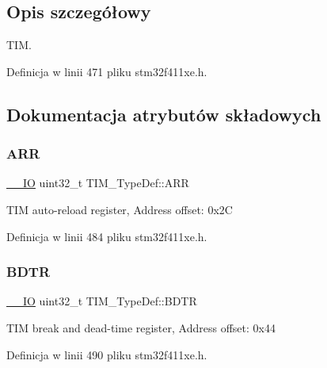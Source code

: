 \subsection{Opis szczegółowy}
T\+IM. 

Definicja w linii 471 pliku stm32f411xe.\+h.



\subsection{Dokumentacja atrybutów składowych}
\mbox{\label{struct_t_i_m___type_def_a6a42766a6ca3c7fe10a810ebd6b9d627}} 
\subsubsection{\texorpdfstring{A\+RR}{ARR}}
{\footnotesize\ttfamily \hyperlink{core__sc300_8h_aec43007d9998a0a0e01faede4133d6be}{\+\_\+\+\_\+\+IO} uint32\+\_\+t T\+I\+M\+\_\+\+Type\+Def\+::\+A\+RR}

T\+IM auto-\/reload register, Address offset\+: 0x2C 

Definicja w linii 484 pliku stm32f411xe.\+h.

\mbox{\label{struct_t_i_m___type_def_a137d3523b60951eca1e4130257b2b23d}} 
\subsubsection{\texorpdfstring{B\+D\+TR}{BDTR}}
{\footnotesize\ttfamily \hyperlink{core__sc300_8h_aec43007d9998a0a0e01faede4133d6be}{\+\_\+\+\_\+\+IO} uint32\+\_\+t T\+I\+M\+\_\+\+Type\+Def\+::\+B\+D\+TR}

T\+IM break and dead-\/time register, Address offset\+: 0x44 

Definicja w linii 490 pliku stm32f411xe.\+h.

\mbox{\label{struct_t_i_m___type_def_ad7271cc1eec9ef16e4ee5401626c0b3b}} 
